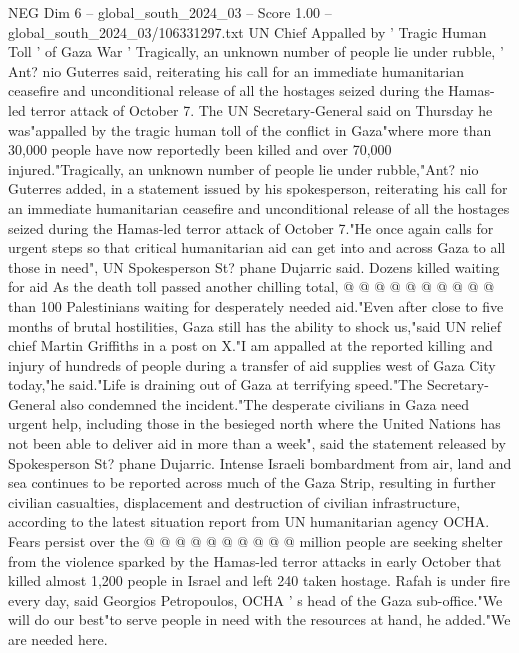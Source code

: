 \begin{textsample}{NEG Dim 6 – global\_south\_2024\_03 – Score 1.00 – global\_south\_2024\_03/106331297.txt}  \label{ex:f6_neg_391}
UN Chief Appalled by ' Tragic Human Toll ' of Gaza War ' Tragically, an unknown number of people lie under rubble, ' Ant? nio Guterres said, reiterating his call for an immediate humanitarian ceasefire and unconditional release of all the hostages seized during the Hamas-led terror attack of October 7.
The UN Secretary-General said on Thursday he was"appalled by the tragic human toll of the conflict in Gaza"where more than 30,000 people have now reportedly been killed and over 70,000 injured."Tragically, an unknown number of people lie under rubble,"Ant? nio Guterres added, in a statement issued by his spokesperson, reiterating his call for an immediate humanitarian ceasefire and unconditional release of all the hostages seized during the Hamas-led terror attack of October 7."He once again calls for urgent steps so that critical humanitarian aid can get into and across Gaza to all those in need", UN Spokesperson St? phane Dujarric said.
Dozens killed waiting for aid As the death toll passed another chilling total, @ @ @ @ @ @ @ @ @ @ than 100 Palestinians waiting for desperately needed aid."Even after close to five months of brutal hostilities, Gaza still has the ability to shock us,"said UN relief chief Martin Griffiths in a post on X."I am appalled at the reported killing and injury of hundreds of people during a transfer of aid supplies west of Gaza City today,"he said."Life is draining out of Gaza at terrifying speed."The Secretary-General also condemned the incident."The desperate civilians in Gaza need urgent help, including those in the besieged north where the United Nations has not been able to deliver aid in more than a week", said the statement released by Spokesperson St? phane Dujarric.
Intense Israeli bombardment from air, land and sea continues to be reported across much of the Gaza Strip, resulting in further civilian casualties, displacement and destruction of civilian infrastructure, according to the latest situation report from UN humanitarian agency OCHA.
Fears persist over the @ @ @ @ @ @ @ @ @ @ million people are seeking shelter from the violence sparked by the Hamas-led terror attacks in early October that killed almost 1,200 people in Israel and left 240 taken hostage.
Rafah is under fire every day, said Georgios Petropoulos, OCHA ' s head of the Gaza sub-office."We will do our best"to serve people in need with the resources at hand, he added."We are needed here.

\end{textsample}
